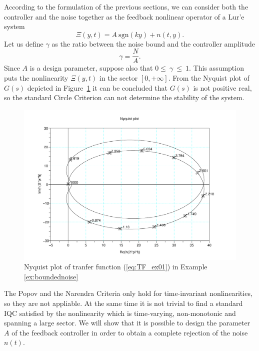 \documentclass[letterpaper,10pt,conference,twocolumn]{IEEEtran}
\newcommand{\sgn}{\mathrm{sgn}}
\begin{document}
According to the formulation of the previous sections, we can consider both the controller and the noise together as the feedback nonlinear operator of a Lur'e system
\begin{equation*}
	\Xi(y,t)=A~\sgn(ky)+n(t,y).
\end{equation*}
Let us define $\gamma$ as the ratio between the noise bound and the controller amplitude
\begin{equation*}
	\gamma=\frac{N}{A}.
\end{equation*}
Since $A$ is a design parameter, suppose also that $0\leq~\gamma~\leq~1$.
This assumption puts the nonlinearity $\Xi(y,t)$ in the sector $[0,+\infty]$.
From the Nyquist plot of $G(s)$ depicted in Figure~\ref{fig:nyquist_quasi-posreal} it can be concluded that $G(s)$ is not positive real, so the standard Circle Criterion can not determine the stability of the system.
\begin{figure}
	\centering
	\includegraphics[width=1\columnwidth]{nyquist_quasiposreal}
	\caption{Nyquist plot of tranfer function (\ref{eq:TF_ex01}) in Example \ref{ex:boundednoise}
	\label{fig:nyquist_quasi-posreal}}
\end{figure}
The Popov and the Narendra Criteria \cite{ChoNar68} only hold for time-invariant nonlinearities, so they are not appliable.
At the same time it is not trivial to find a standard IQC satisfied by the nonlinearity
which is time-varying, non-monotonic and spanning a large sector.
We will show that it is possible to design the parameter $A$ of the feedback
controller in order to obtain a complete rejection of the noise $n(t)$.
\end{document}
